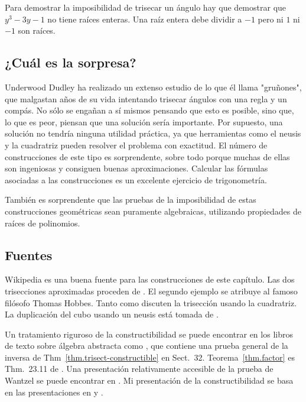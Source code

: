 Para demostrar la imposibilidad de trisecar un ángulo hay que demostrar que $y^3-3y-1$ no tiene raíces enteras. Una raíz entera debe dividir a $-1$ pero ni $1$ ni $-1$ son raíces.

\subsection*{¿Cuál es la sorpresa?}

Underwood Dudley ha realizado un extenso estudio de lo que él llama "gruñones", que malgastan años de su vida intentando trisecar ángulos con una regla y un compás. No sólo se engañan a sí mismos pensando que esto es posible, sino que, lo que es peor, piensan que una solución sería importante. Por supuesto, una solución no tendría ninguna utilidad práctica, ya que herramientas como el neusis y la cuadratriz pueden resolver el problema con exactitud. El número de construcciones de este tipo es sorprendente, sobre todo porque muchas de ellas son ingeniosas y consiguen buenas aproximaciones. Calcular las fórmulas asociadas a las construcciones es un excelente ejercicio de trigonometría.

También es sorprendente que las pruebas de la imposibilidad de estas construcciones geométricas sean puramente algebraicas, utilizando propiedades de raíces de polinomios.

\subsection*{Fuentes}

Wikipedia \cite{wiki:tri, wiki:neu, wiki:quad} es una buena fuente para las construcciones de este capítulo.
Las dos trisecciones aproximadas proceden de \cite[pp.
~67--68, 95--96]{dudley-budget}. El segundo ejemplo se atribuye al famoso filósofo Thomas Hobbes. Tanto \cite[pp.~48--49]{martin} como \cite[pp.~6--7]{dudley-budget} discuten la trisección usando la cuadratriz.
La duplicación del cubo usando un neusis está tomada de \cite{dorrie2}.

Un tratamiento riguroso de la constructibilidad se puede encontrar en los libros de texto sobre álgebra abstracta como \cite{fraleigh}, que contiene una prueba general de la inversa de Thm~\ref{thm.trisect-constructible} en Sect.~32.
Teorema~\ref{thm.factor} es Thm.~23.11 de \cite{fraleigh}.
Una presentación relativamente accesible de la prueba de Wantzel se puede encontrar en \cite{suzuki}. Mi presentación de la constructibilidad se basa en las presentaciones en \cite[Cap.~III]{courant} y \cite{laugwitz}.
